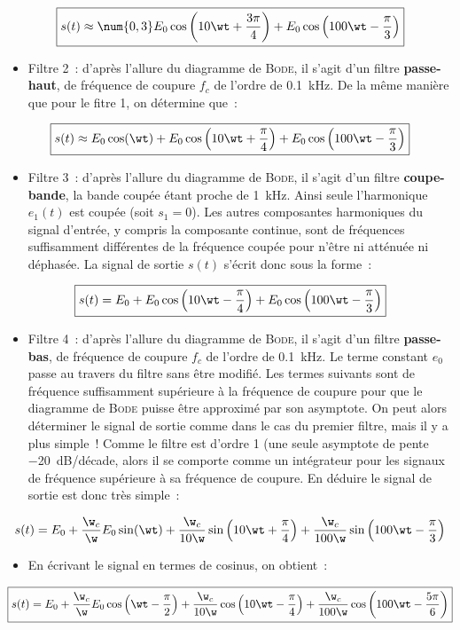 \documentclass[a4paper, 12pt, final, garamond]{book}
\begin{document}
{	\[\boxed{
			s(t) \approx
			\num{0,3}E_0 \cos \left(10\wt + \frac{3\pi}{4}\right) +
			E_0 \cos \left(100\wt - \frac{\pi}{3}\right)
		}\]

	\begin{itemize}
		\item Filtre 2~: d'après l'allure du diagramme de \textsc{Bode}, il s'agit d'un
		      filtre \textbf{passe-haut}, de fréquence de coupure $f_c$ de l'ordre de
		      \SI{0.1}{kHz}. De la même manière que pour le fitre 1, on détermine que~:
	\end{itemize}

	\[\boxed{
			s(t) \approx
			E_0 \cos (\wt) + E_0 \cos \left(10\wt + \frac{\pi}{4}\right) +
			E_0 \cos \left(100\wt - \frac{\pi}{3}\right)
		}\]
	\begin{itemize}
		\item Filtre 3~: d'après l'allure du diagramme de \textsc{Bode}, il s'agit d'un
		      filtre \textbf{coupe-bande}, la bande coupée étant proche de
		      \SI{1}{kHz}. Ainsi seule l'harmonique $e_1(t)$ est coupée (soit $s_1 =
			      0$). Les autres composantes harmoniques du signal d'entrée, y compris la
		      composante continue, sont de fréquences suffisamment différentes de la
		      fréquence coupée pour n'être ni atténuée ni déphasée. La signal de
		      sortie $s(t)$ s'écrit donc sous la forme~:
	\end{itemize}

	\[\boxed{
			s(t) =
			E_0 +
			E_0 \cos \left(10\wt - \frac{\pi}{4}\right) +
			E_0 \cos \left(100\wt - \frac{\pi}{3}\right)
		}\]
	\begin{itemize}
		\item Filtre 4~: d'après l'allure du diagramme de \textsc{Bode}, il s'agit
		      d'un filtre \textbf{passe-bas}, de fréquence de coupure $f_c$ de l'ordre
		      de \SI{0.1}{kHz}. Le terme constant $e_0$ passe au travers du filtre
		      sans être modifié. Les termes suivants sont de fréquence suffisamment
		      supérieure à la fréquence de coupure pour que le diagramme de
		      \textsc{Bode} puisse être approximé par son asymptote. On peut alors
		      déterminer le signal de sortie comme dans le cas du premier filtre, mais
		      il y a plus simple~! Comme le filtre est d'ordre 1 (une seule asymptote
		      de pente \SI{-20}{dB/décade}, alors il se comporte comme un intégrateur
		      pour les signaux de fréquence supérieure à sa fréquence de coupure. En
		      déduire le signal de sortie est donc très simple~:
	\end{itemize}

	\[s(t) =
		E_0 +
		\frac{\w_c}{\w}E_0\sin(\wt) +
		\frac{\w_c}{10\w}\sin \left( 10\wt + \frac{\pi}{4} \right) +
		\frac{\w_c}{100\w} \sin \left( 100\wt - \frac{\pi}{3} \right)
	\]
	\begin{itemize}
		\item{}
		      En écrivant le signal en termes de cosinus, on obtient~:
	\end{itemize}
	\[\boxed{
			s(t) =
			E_0 +
			\frac{\w_c}{\w}E_0\cos\left(\wt - \frac{\pi}{2}\right) +
			\frac{\w_c}{10\w}\cos \left( 10\wt - \frac{\pi}{4} \right) +
			\frac{\w_c}{100\w} \cos \left( 100\wt - \frac{5\pi}{6} \right)
		}\]
}
\end{document}
